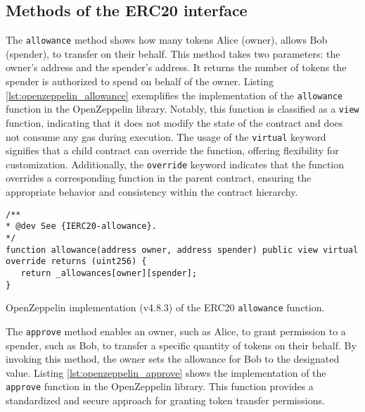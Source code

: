 
\subsection{Methods of the ERC20 interface}
\label{subsec:erc20_methods}


The \texttt{allowance} method shows how many tokens Alice (owner), allows Bob (spender), to transfer on their behalf. This method takes two parameters: the owner's address and the spender's address. It returns the number of tokens the spender is authorized to spend on behalf of the owner.
Listing \ref{lst:openzeppelin_allowance} exemplifies the implementation of the \texttt{allowance} function in the OpenZeppelin library. Notably, this function is classified as a \texttt{view} function, indicating that it does not modify the state of the contract and does not consume any gas during execution.
The usage of the \texttt{virtual} keyword signifies that a child contract can override the function, offering flexibility for customization. Additionally, the \texttt{override} keyword indicates that the function overrides a corresponding function in the parent contract, ensuring the appropriate behavior and consistency within the contract hierarchy.


\begin{listing}[!ht]
   \begin{verbatim}
/**
* @dev See {IERC20-allowance}.
*/
function allowance(address owner, address spender) public view virtual override returns (uint256) {
   return _allowances[owner][spender];
}
   \end{verbatim}
   \caption{OpenZeppelin implementation (v4.8.3) of the ERC20 \texttt{allowance} function.}
   \label{lst:openzeppelin_allowance}
\end{listing}



The \texttt{approve} method enables an owner, such as Alice, to grant permission to a spender, such as Bob, to transfer a specific quantity of tokens on their behalf. By invoking this method, the owner sets the allowance for Bob to the designated value.
Listing \ref{lst:openzeppelin_approve} shows the implementation of the \texttt{approve} function in the OpenZeppelin library. 
This function provides a standardized and secure approach for granting token transfer permissions.

